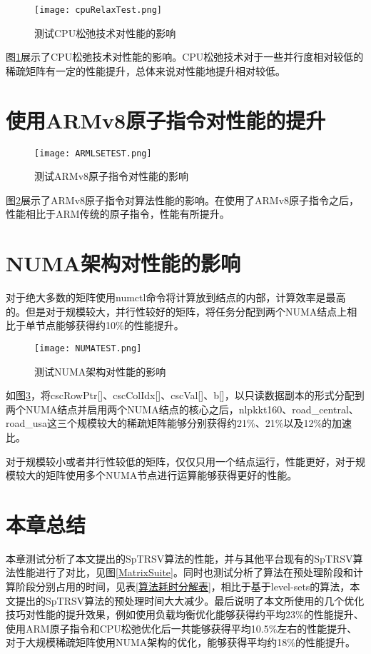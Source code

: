 \begin{figure}[htbp]
    \centering
    \texttt{[image: cpuRelaxTest.png]}
    \caption{测试CPU松弛技术对性能的影响}
    \label{测试CPU松弛技术对性能的影响}
\end{figure}

图\ref{测试CPU松弛技术对性能的影响}展示了CPU松弛技术对性能的影响。CPU松弛技术对于一些并行度相对较低的稀疏矩阵有一定的性能提升，总体来说对性能地提升相对较低。

\section{使用ARMv8原子指令对性能的提升}

\begin{figure}[htbp]
    \centering
    \texttt{[image: ARMLSETEST.png]}
    \caption{测试ARMv8原子指令对性能的影响}
    \label{测试ARMv8原子指令对性能的影响}
\end{figure}

图\ref{测试ARMv8原子指令对性能的影响}展示了ARMv8原子指令对算法性能的影响。在使用了ARMv8原子指令之后，性能相比于ARM传统的原子指令，性能有所提升。

\section{NUMA架构对性能的影响}\label{NUMA架构对性能的影响}

对于绝大多数的矩阵使用numctl命令将计算放到结点的内部，计算效率是最高的。但是对于规模较大，并行性较好的矩阵，将任务分配到两个NUMA结点上相比于单节点能够获得约10\%的性能提升。

\begin{figure}[htbp]
    \centering
    \texttt{[image: NUMATEST.png]}
    \caption{测试NUMA架构对性能的影响}
    \label{测试NUMA架构对性能的影响}
\end{figure}

如图\ref{测试NUMA架构对性能的影响}，将cscRowPtr[]、cscColIdx[]、cscVal[]、b[]，以只读数据副本的形式分配到两个NUMA结点并启用两个NUMA结点的核心之后，nlpkkt160、road\_central、road\_usa这三个规模较大的稀疏矩阵能够分别获得约21\%、21\%以及12\%的加速比。

对于规模较小或者并行性较低的矩阵，仅仅只用一个结点运行，性能更好，对于规模较大的矩阵使用多个NUMA节点进行运算能够获得更好的性能。

\section{本章总结}

本章测试分析了本文提出的SpTRSV算法的性能，并与其他平台现有的SpTRSV算法性能进行了对比，见图\ref{MatrixSuite}。同时也测试分析了算法在预处理阶段和计算阶段分别占用的时间，见表\ref{算法耗时分解表}，相比于基于level-sets的算法，本文提出的SpTRSV算法的预处理时间大大减少。最后说明了本文所使用的几个优化技巧对性能的提升效果，例如使用负载均衡优化能够获得约平均23\%的性能提升、使用ARM原子指令和CPU松弛优化后一共能够获得平均10.5\%左右的性能提升、对于大规模稀疏矩阵使用NUMA架构的优化，能够获得平均约18\%的性能提升。


\endinput